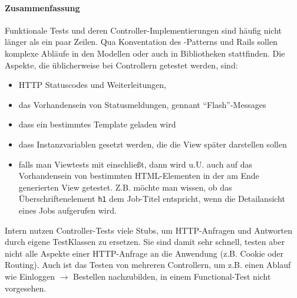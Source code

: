 \begin{ruby}[label=app/controllers/jobs\_controller.rb ]

 
    \PY{o}{[}\PY{o}{]}
    
        
\end{ruby}



\paragraph{Zusammenfassung}
Funktionale Tests und deren Controller-Implementierungen sind häufig nicht länger als ein paar Zeilen. Qua Konventation des -Patterns und Rails sollen komplexe Abläufe in den Modellen oder auch in Bibliotheken stattfinden. 
Die Aspekte, die üblicherweise bei Controllern getestet werden, sind:
\begin{itemize}
 \item HTTP Statuscodes und Weiterleitungen,
 \item das Vorhandensein von Statusmeldungen, gennant "`Flash"'-Messages
 \item dass ein bestimmtes Template geladen wird
 \item dass Instanzvariablen gesetzt werden, die die View später darstellen sollen
 \item falls man Viewtests mit einschließt, dann wird u.U. auch auf das Vorhandensein von bestimmten HTML-Elementen in der am Ende generierten View getestet. Z.B. möchte man wissen, ob das Überschriftenelement \texttt{h1} dem Job-Titel entspricht, wenn die Detailansicht eines Jobs aufgerufen wird.
\end{itemize}

Intern nutzen Controller-Tests viele Stubs, um HTTP-Anfragen und Antworten durch eigene TestKlassen zu ersetzen. Sie sind damit sehr schnell, testen aber nicht alle Aspekte einer HTTP-Anfrage an die Anwendung (z.B. Cookie oder Routing). Auch ist das Testen von mehreren Controllern, um z.B. einen Ablauf wie Einloggen $\to$ Bestellen nachzubilden, in einem Functional-Test nicht vorgesehen.
